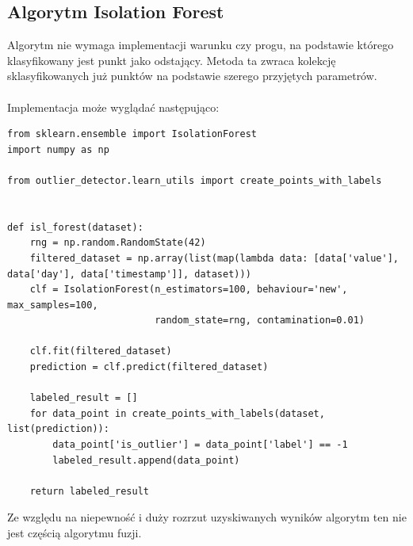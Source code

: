 \documentclass[eng,printmode]{mgr}
\begin{document}
\subsection{Algorytm Isolation Forest}
Algorytm nie wymaga implementacji warunku czy progu, na podstawie którego klasyfikowany jest punkt jako odstający. Metoda ta zwraca kolekcję sklasyfikowanych już punktów na podstawie szerego przyjętych parametrów.
\\\\
Implementacja może wyglądać następująco:
\\
\begin{lstlisting}
from sklearn.ensemble import IsolationForest
import numpy as np

from outlier_detector.learn_utils import create_points_with_labels


def isl_forest(dataset):
    rng = np.random.RandomState(42)
    filtered_dataset = np.array(list(map(lambda data: [data['value'], data['day'], data['timestamp']], dataset)))
    clf = IsolationForest(n_estimators=100, behaviour='new', max_samples=100,
                          random_state=rng, contamination=0.01)

    clf.fit(filtered_dataset)
    prediction = clf.predict(filtered_dataset)

    labeled_result = []
    for data_point in create_points_with_labels(dataset, list(prediction)):
        data_point['is_outlier'] = data_point['label'] == -1
        labeled_result.append(data_point)

    return labeled_result
\end{lstlisting}


Ze względu na niepewność i duży rozrzut uzyskiwanych wyników algorytm ten nie jest częścią algorytmu fuzji.
\end{document}
